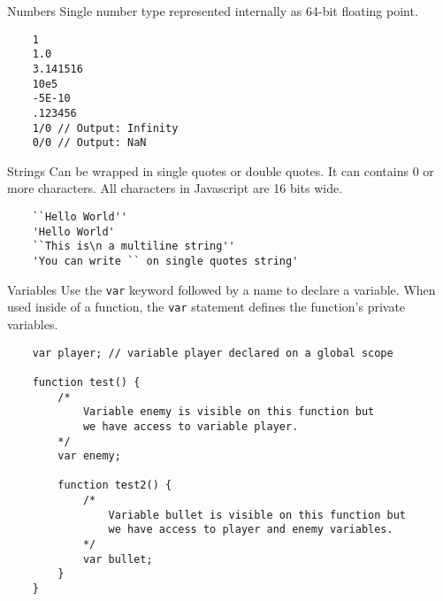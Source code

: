 \begin{frame}[fragile]
  \begin{block}{Numbers}
    Single number type represented internally as 64-bit floating point.
    {\scriptsize
    \begin{verbatim}
    1
    1.0
    3.141516
    10e5
    -5E-10
    .123456
    1/0 // Output: Infinity
    0/0 // Output: NaN
    \end{verbatim}
    }
  \end{block}

  \begin{block}{Strings}
    Can be wrapped in single quotes or double quotes. It can contains 0 or more characters. All characters in Javascript are 16 bits wide.
    {\scriptsize
    \begin{verbatim}
    ``Hello World''
    'Hello World'
    ``This is\n a multiline string''
    'You can write `` on single quotes string'
    \end{verbatim}
    }
  \end{block}
\end{frame}

\begin{frame}[fragile]
  \begin{block}{Variables}
    Use the \texttt{var} keyword followed by a name to declare a variable. When used inside of a function, the \texttt{var} statement defines the function's private variables.
    \scriptsize{
    \begin{verbatim}
    var player; // variable player declared on a global scope

    function test() {
        /* 
            Variable enemy is visible on this function but 
            we have access to variable player.
        */
        var enemy;

        function test2() {
            /* 
                Variable bullet is visible on this function but 
                we have access to player and enemy variables.
            */
            var bullet; 
        }
    }
    \end{verbatim}
    }
  \end{block}
\end{frame}

